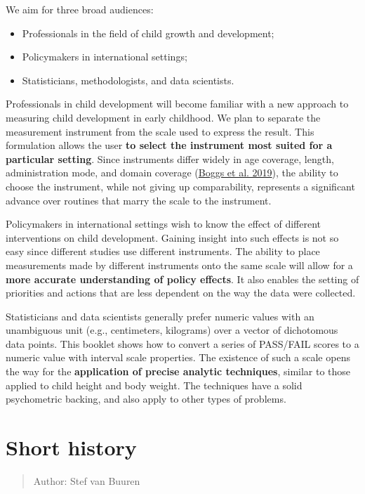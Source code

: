 \documentclass[
]{book}
\providecommand{\tightlist}{%
  \setlength{\itemsep}{0pt}\setlength{\parskip}{0pt}}
\begin{document}
We aim for three broad audiences:

\begin{itemize}
\tightlist
\item
  Professionals in the field of child growth and development;
\item
  Policymakers in international settings;
\item
  Statisticians, methodologists, and data scientists.
\end{itemize}

Professionals in child development will become familiar with a new approach to measuring child development in early childhood. We plan to separate the measurement instrument from the scale used to express the result. This formulation allows the user \textbf{to select the instrument most suited for a particular setting}. Since instruments differ widely in age coverage, length, administration mode, and domain coverage (\protect\hyperlink{ref-boggs2019}{Boggs et al. 2019}), the ability to choose the instrument, while not giving up comparability, represents a significant advance over routines that marry the scale to the instrument.

Policymakers in international settings wish to know the effect of different interventions on child development. Gaining insight into such effects is not so easy since different studies use different instruments. The ability to place measurements made by different instruments onto the same scale will allow for a \textbf{more accurate understanding of policy effects}. It also enables the setting of priorities and actions that are less dependent on the way the data were collected.

Statisticians and data scientists generally prefer numeric values with an unambiguous unit (e.g., centimeters, kilograms) over a vector of dichotomous data points. This booklet shows how to convert a series of PASS/FAIL scores to a numeric value with interval scale properties. The existence of such a scale opens the way for the \textbf{application of precise analytic techniques}, similar to those applied to child height and body weight. The techniques have a solid psychometric backing, and also apply to other types of problems.

\hypertarget{ch:history}{%
\chapter{Short history}\label{ch:history}}

\begin{quote}
Author: Stef van Buuren
\end{quote}
\end{document}
